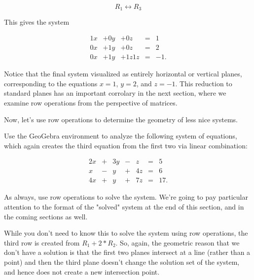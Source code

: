 \documentclass{ximera}
\begin{document}
\begin{exploration}
\begin{example}
\begin{solution}
            $$R_1\leftrightarrow R_3$$

            This gives the system 

            $$\begin{array}{ccccccc}
                 1x& +0y&+0z &=&1 \\
                0x&+1y& +0z& =&2\\
                0x &+1y &+1z 1z&=&-1.
            \end{array}$$

        \end{solution}
    \end{example}

    \begin{remark}

        Notice that the final system visualized as entirely horizontal or vertical planes, corresponding to the equations $x=1$, $y=2$, and $z=-1$. This reduction to standard planes has an important corrolary in the next section, where we examine row operations from the perspective of matrices. 

    \end{remark}

    Now, let's use row operations to determine the geometry of less nice systems.

\begin{example}

    Use the GeoGebra environment to analyze the following system of equations, which again creates the third equation from the first two via linear combination:

    $$\begin{array}{ccccccc}
        2x & +&3y&-&z&= &5 \\
        x& -&y&+&4z&=&6\\
        4x& +&y&+&7z&=&17.
    \end{array}$$

    As always, use row operations to solve the system. We're going to pay particular attention to the format of the "solved" system at the end of this section, and in the coming sections as well.

    \begin{solution}

        While you don't need to know this to solve the system using row operations, the third row is created from $R_1+2*R_2$. So, again, the geometric reason that we don't have a solution is that the first two planes intersect at a line (rather than a point) and then the third plane doesn't change the solution set of the system, and hence does not create a new intersection point.


\end{solution}
\end{example}
\end{exploration}
\end{document}
